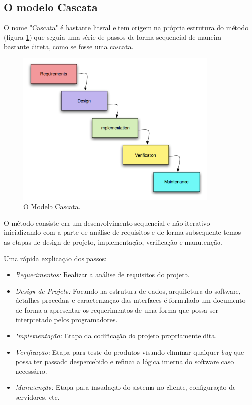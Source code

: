 \subsection{O modelo Cascata}
    \par O nome "Cascata" é bastante literal e tem origem na própria estrutura do método (figura \ref{fig:waterfall}) que seguia uma série de passos de forma sequencial de maneira bastante direta, como se fosse uma cascata.
\begin{figure}[htb]
\centering
\includegraphics[width=10cm]{figuras/waterfall}
\caption{\label{fig:waterfall}O Modelo Cascata.}
\end{figure}
\par O método consiste em um desenvolvimento sequencial e não-iterativo inicializando com a parte de análise de requisitos e de forma subsequente temos as etapas de design de projeto, implementação, verificação e manutenção.

Uma rápida explicação dos passos:
\begin{itemize}
\item \emph{ Requerimentos:} Realizar a análise de requisitos do projeto.
\item \emph{ Design de Projeto:}  Focando na estrutura de dados, arquitetura do software, detalhes procedais e caracterização das interfaces é formulado um documento de forma a apresentar os requerimentos de uma forma que possa ser interpretado pelos programadores.
\item \emph{ Implementação:} Etapa da codificação do projeto propriamente dita.
\item \emph{  Verificação: } Etapa para teste do produtos visando eliminar qualquer \emph{bug} que possa ter passado despercebido e refinar a lógica interna do software caso necessário.
\item \emph{ Manutenção: } Etapa para instalação do sistema no cliente, configuração de servidores, etc.
\end{itemize}

